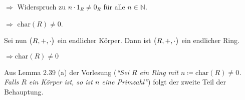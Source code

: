 \documentclass{scrreprt}
\newcommand\Char{\text{char}}
\begin{document}
\begin{enumerate}[(i)]
  $\Rightarrow$ Widerspruch zu $n \cdot 1_R \ne 0_R$ für alle $n \in \mathbb{N}$.

  $\Rightarrow$ \underline{$\Char(R) \ne 0$}.

  Sei nun $\qty\big(R, +, \cdot)$ ein endlicher Körper.
  Dann ist $\qty\big(R, +, \cdot)$ ein endlicher Ring.

  $\Rightarrow \Char(R) \ne 0$

  Aus Lemma 2.39 (a) der Vorlesung (\emph{``Sei $R$ ein Ring mit
    $n \coloneqq \Char(R) \ne 0$. Falls $R$ ein Körper ist, so ist $n$ eine
    Primzahl''}) folgt der zweite Teil der Behauptung.
\end{enumerate}
\end{document}

